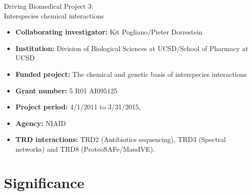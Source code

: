 \documentclass[arial,11pt]{article}
\begin{document}
\begin{center}
{\Large  \bf{Driving Biomedical Project 3:\\  Interspecies chemical interactions


}}
\end{center}

\begin{itemize}
\item {\bf Collaborating investigator:}  Kit Pogliano/Pieter Dorrestein
\item {\bf Institution:} Division of Biological Sciences at UCSD/School of Pharmacy at UCSD
\item {\bf Funded project:} 	The chemical and genetic basis of interspecies interactions
\item {\bf Grant number:} 	5 R01 AI095125   	
\item {\bf Project period:}   4/1/2011 to 3/31/2015,
\item {\bf Agency:}  NIAID
\item {\bf TRD interactions:}  TRD2 (Antibiotics sequencing), TRD3 (Spectral networks) and TRD8 (ProteoSAFe/MassIVE).
\end{itemize}


\section{Significance}

\end{document}

